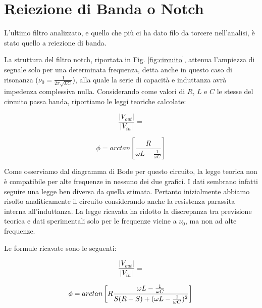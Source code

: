\section{Reiezione di Banda o Notch}
L'ultimo filtro analizzato, e quello che più ci ha dato filo da torcere nell'analisi, è stato quello a reiezione di banda.

La struttura del filtro notch, riportata in Fig. \ref{fig:circuito}, attenua l'ampiezza di segnale solo per una determinata frequenza, detta anche in questo caso di risonanza ($\nu_0=\frac{1}{2 \pi \sqrt{LC}}$), alla quale la serie di capacità e induttanza avrà impedenza complessiva nulla. Considerando come valori di $R$, $L$ e $C$ le stesse del circuito passa banda, riportiamo le leggi teoriche calcolate:\\

\noindent
\begin{minipage}{.5\linewidth}
\begin{equation}
\frac{|V_{out}|}{|V_{in}|}=
\label{notchGain}
\end{equation}
\end{minipage}%
\begin{minipage}{.5\linewidth}
\begin{equation}
\phi=arctan\left[\frac{R}{\omega L-\frac{1}{\omega C}}\right]
\label{notchPhi}
\end{equation}
\end{minipage}
\break

Come osserviamo dal diagramma di Bode per questo circuito, la legge teorica non è compatibile per alte frequenze in nessuno dei due grafici. I dati sembrano infatti seguire una legge ben diversa da quella stimata. Pertanto inizialmente abbiamo risolto analiticamente il circuito considerando anche la resistenza parassita interna all'induttanza. La legge ricavata ha ridotto la discrepanza tra previsione teorica e dati sperimentali solo per le frequenze vicine a $\nu_0$, ma non ad alte frequenze.

Le formule ricavate sono le seguenti:\\

\noindent
\begin{minipage}{.5\linewidth}
\begin{equation}
\frac{|V_{out}|}{|V_{in}|}=
\label{eq:notchGain_corr}
\end{equation}

\end{minipage}%
\begin{minipage}{.5\linewidth}
\begin{equation}
\phi=arctan\left[
R \frac{\omega L-\frac{1}{\omega C}}{S (R+S)+(\omega L-\frac{1}{\omega C})^2}
\right]\\
\label{eq:notchPhi_corr}
\end{equation}
\end{minipage}
\break

